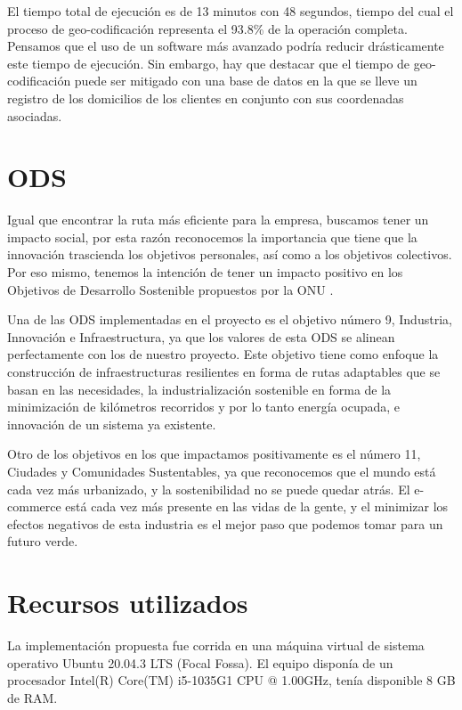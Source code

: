 \documentclass[journal]{IEEEtran}
\begin{document}
            El tiempo total de ejecución es de 13 minutos con 48 segundos, tiempo del cual el proceso de geo-codificación representa el 93.8\% de la operación completa. Pensamos que el uso de un software más avanzado podría reducir drásticamente este tiempo de ejecución. Sin embargo, hay que destacar que el tiempo de geo-codificación puede ser mitigado con una base de datos en la que se lleve un registro de los domicilios de los clientes en conjunto con sus coordenadas asociadas.
        
    \section{ODS} \label{sec:ods}
    
        Igual que encontrar la ruta más eficiente para la empresa, buscamos tener un impacto social, por esta razón reconocemos la importancia que tiene que la innovación trascienda los objetivos personales, así como a los objetivos colectivos. Por eso mismo, tenemos la intención de tener un impacto positivo en los Objetivos de Desarrollo Sostenible propuestos por la ONU \cite{united-nations-2015}. 
        
        Una de las ODS implementadas en el proyecto es el objetivo número 9,  Industria, Innovación e Infraestructura, ya que los valores de esta ODS se alinean perfectamente con los de nuestro proyecto. Este objetivo tiene como enfoque la construcción de infraestructuras resilientes en forma de rutas adaptables que se basan en las necesidades, la industrialización sostenible en forma de la minimización de kilómetros recorridos y por lo tanto energía ocupada, e innovación de un sistema ya existente. 
        
        Otro de los objetivos en los que impactamos positivamente es el número 11, Ciudades y Comunidades Sustentables, ya que reconocemos que el mundo está cada vez más urbanizado, y la sostenibilidad no se puede quedar atrás. El e-commerce está cada vez más presente en las vidas de la gente, y el minimizar los efectos negativos de esta industria es el mejor paso que podemos tomar para un futuro verde. 

    \section{Recursos utilizados} \label{sec:resources}
        
        La implementación propuesta fue corrida en una máquina virtual de sistema operativo Ubuntu 20.04.3 LTS (Focal Fossa). El equipo disponía de un procesador Intel(R) Core(TM) i5-1035G1 CPU @ 1.00GHz, tenía disponible 8 GB de RAM.
\end{document}
